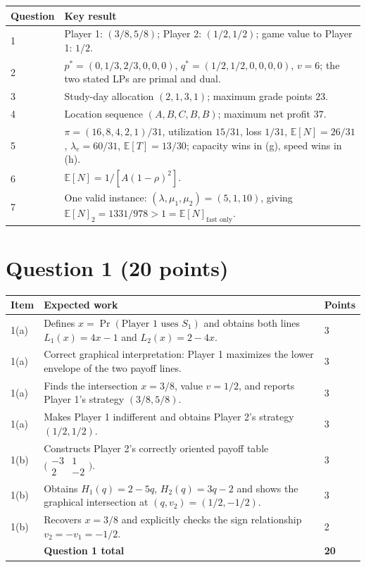 \documentclass[11pt,letterpaper]{article}
\newcommand{\E}{\mathbb{E}}
\newcommand{\rubricsection}[2]{%
  \section*{\color{hkustblue}Question #1 \normalfont\normalsize (#2 points)}
}
\begin{document}
\begin{longtable}{L{0.10\textwidth}L{0.81\textwidth}}
\toprule
Question & Key result \\
 & Player 1: $(3/8,5/8)$; Player 2: $(1/2,1/2)$; game value to Player 1: $1/2$.\\
2 & $p^*=(0,1/3,2/3,0,0,0)$, $q^*=(1/2,1/2,0,0,0,0)$, $v=6$; the two stated LPs are primal and dual.\\
3 & Study-day allocation $(2,1,3,1)$; maximum grade points $23$.\\
4 & Location sequence $(A,B,C,B,B)$; maximum net profit $37$.\\
5 & $\pi=(16,8,4,2,1)/31$, utilization $15/31$, loss $1/31$, $\E[N]=26/31$, $\lambda_e=60/31$, $\E[T]=13/30$; capacity wins in (g), speed wins in (h).\\
6 & $\E[N]=1/[A(1-\rho)^2]$.\\
7 & One valid instance: $(\lambda,\mu_1,\mu_2)=(5,1,10)$, giving $\E[N]_{2}=1331/978>1=\E[N]_{\text{fast only}}$.\\
\bottomrule
\end{longtable}

\rubricsection{1}{20}

\begin{longtable}{L{0.12\textwidth}L{0.72\textwidth}C{0.08\textwidth}}
\toprule
Item & Expected work & Points \\
(a) & Defines $x=\Pr(\text{Player 1 uses }S_1)$ and obtains both lines
$L_1(x)=4x-1$ and $L_2(x)=2-4x$. & 3\\
1(a) & Correct graphical interpretation: Player 1 maximizes the lower envelope of
the two payoff lines. & 3\\
1(a) & Finds the intersection $x=3/8$, value $v=1/2$, and reports Player 1's
strategy $(3/8,5/8)$. & 3\\
1(a) & Makes Player 1 indifferent and obtains Player 2's strategy
$(1/2,1/2)$. & 3\\
1(b) & Constructs Player 2's correctly oriented payoff table
$\bigl(\begin{smallmatrix}-3&1\\2&-2\end{smallmatrix}\bigr)$. & 3\\
1(b) & Obtains $H_1(q)=2-5q$, $H_2(q)=3q-2$ and shows the graphical intersection
at $(q,v_2)=(1/2,-1/2)$. & 3\\
1(b) & Recovers $x=3/8$ and explicitly checks the sign relationship
$v_2=-v_1=-1/2$. & 2\\
\midrule
& \textbf{Question 1 total} & \textbf{20}\\
\bottomrule
\end{longtable}
\end{document}
